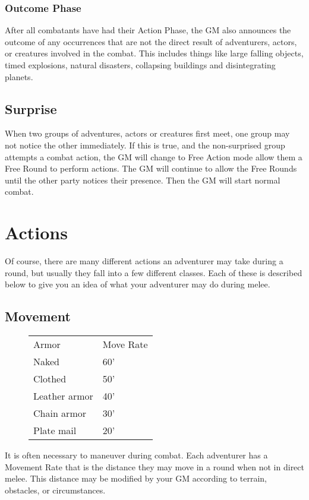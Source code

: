 \begin{multicols*}{2}
\subsubsection{Outcome Phase}
After all combatants have had their Action Phase, the GM also announces the outcome of any occurrences that are not the direct result of adventurers, actors, or creatures involved in the combat. This includes things like large falling objects, timed explosions, natural disasters, collapsing buildings and disintegrating planets.
\subsection{Surprise}
When two groups of adventures, actors or creatures first meet, one group may not notice the other immediately. If this is true, and the non-surprised group attempts a combat
action, the GM will change to Free Action mode allow them a Free Round to perform actions. The GM will continue to allow the Free Rounds until the other party notices their presence. Then the GM will start normal combat.
\section{Actions}
Of course, there are many different actions an adventurer may take during a round, but usually they fall into a few different classes. Each of these is described below to give you an idea of what your adventurer may do during melee.
\subsection{Movement}
\begin{wrapfigure}[9]{o}[0pt]{4cm}
\begin{normbox}
\small
\begin{tabular}{@{}l l}
Armor & Move Rate\\
Naked & 60'\\
Clothed & 50'\\
Leather armor & 40'\\
Chain armor & 30'\\
Plate mail & 20'\\
\end{tabular}
\end{normbox}
\end{wrapfigure}

It is often necessary to maneuver during combat. Each adventurer has a Movement Rate that is the distance they may move in a round when not in direct melee. This distance may be modified by your GM according to terrain, obstacles, or circumstances.


\end{multicols*}
